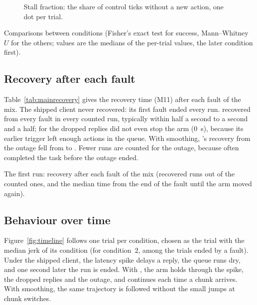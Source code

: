 \begin{figure}[htbp]
  \centering
  \caption{Stall fraction: the share of control ticks without a new action, one dot per trial.}
  \label{fig:stall}
\end{figure}

\begin{table}[htbp]
  \centering
  \small
  \begin{adjustbox}{max width=\textwidth}
  \end{adjustbox}
  \caption{Comparisons between conditions (Fisher's exact test for success, Mann--Whitney $U$ for the others; values
           are the medians of the per-trial values, the later condition first).}\label{tab:tests}
\end{table}

\subsection{Recovery after each fault}

Table~\ref{tab:mainrecovery} gives the recovery time (M11) after each fault of the mix. The shipped client never
recovered: its first fault ended every run. \drtc{} recovered from every fault in every counted run, typically within
half a second to a second and a half; for \smolvla{} the dropped replies did not even stop the arm (0~s), because its
earlier trigger left enough actions in the queue. With smoothing, \groot's recovery from the outage fell from
 to . Fewer runs are counted for the outage, because
\smolvla{} often completed the task before the outage ended.

\begin{table}[htbp]
  \centering
  \small
  \begin{adjustbox}{max width=\textwidth}
  \end{adjustbox}
  \caption{The first run: recovery after each fault of the mix (recovered runs out of the counted ones, and the median
           time from the end of the fault until the arm moved again).}\label{tab:mainrecovery}
\end{table}

\subsection{Behaviour over time}

Figure~\ref{fig:timeline} follows one \smolvla{} trial per condition, chosen as the trial with the median jerk of its
condition (for condition~2, among the trials ended by a fault). Under the shipped client, the latency spike delays a
reply, the queue runs dry, and one second later the run is ended. With \drtc, the arm holds through the spike, the
dropped replies and the outage, and continues each time a chunk arrives. With smoothing, the same trajectory is
followed without the small jumps at chunk switches.

